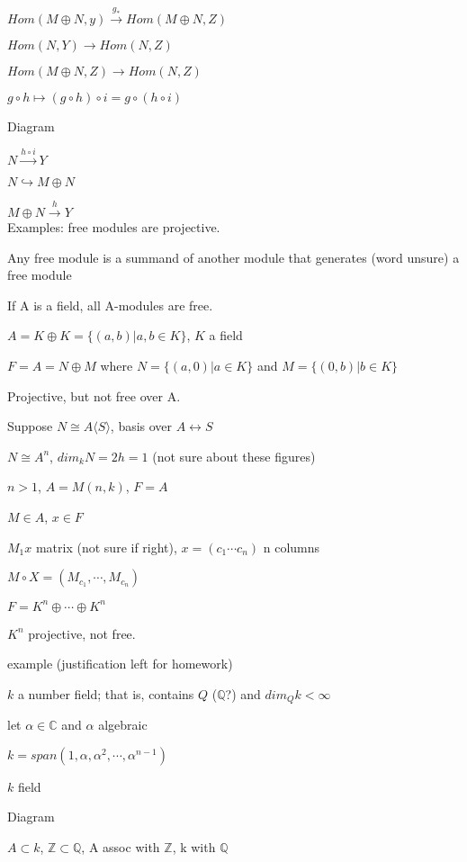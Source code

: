 \documentclass[12pt]{article}
\begin{document}
$Hom(M \oplus N, y) \xrightarrow{g_*} Hom(M \oplus N, Z)$

$Hom(N, Y) \to Hom(N, Z)$

$Hom(M \oplus N, Z) \to Hom(N, Z)$

$g \circ h \mapsto (g \circ h) \circ i = g \circ (h \circ i)$

\noindent
Diagram

$N \xrightarrow{h \circ i} Y$

$N \hookrightarrow M \oplus N$

$M \oplus N \xrightarrow{h} Y$\\

\noindent
Examples: free modules are projective.

Any free module is a summand of another module that generates (word unsure) a free module

If A is a field, all A-modules are free.

\noindent
$A = K \oplus K = \{(a, b) | a, b \in K\}$, $K$ a field

$F = A = N \oplus M$ where $N = \{(a, 0)| a \in K\}$ and $M = \{(0, b) | b \in K\}$

Projective, but not free over A.

Suppose $N \cong A\langle S\rangle$, basis over $A \leftrightarrow S$

$N \cong A^n$, $dim_kN = 2h = 1$ (not sure about these figures)

$n > 1$, $A = M(n, k)$, $F = A$

$M \in A$, $x \in F$

$M_1x$ matrix (not sure if right), $x = (c_1 \cdots c_n)$ n columns

$M \circ X = (M_{c_1}, \cdots, M_{c_n})$

$F = K^n \oplus \cdots \oplus K^n$

$K^n$ projective, not free.

\noindent
example (justification left for homework)

$k$ a number field; that is, contains $Q$ ($\mathds{Q}$?) and $dim_Qk < \infty$

let $\alpha \in \mathds{C}$ and $\alpha$ algebraic

$k = span(1, \alpha, \alpha^2, \cdots, \alpha^{n - 1})$

$k$ field

\noindent
Diagram

$A \subset k$, $\mathds{Z} \subset \mathds{Q}$, A assoc with $\mathds{Z}$, k with $\mathds{Q}$
\end{document}
